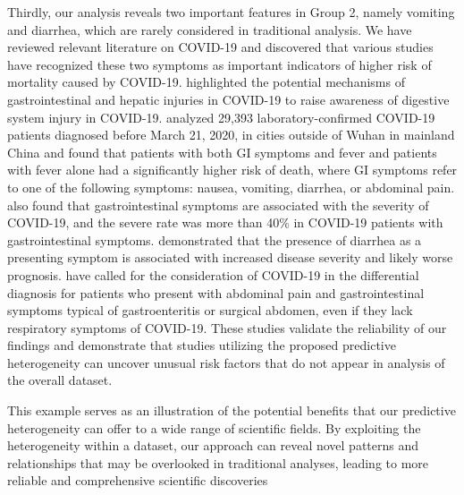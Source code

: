 Thirdly, our analysis reveals two important features in Group 2, namely vomiting and diarrhea, which are rarely considered in traditional analysis. 
We have reviewed relevant literature on COVID-19 and discovered that various studies have recognized these two symptoms as important indicators of higher risk of mortality caused by COVID-19. 
\citet{2020COVID} highlighted the potential mechanisms of gastrointestinal and hepatic injuries in COVID-19 to raise awareness of digestive system injury in COVID-19. 
\citet{Liu442} analyzed 29,393 laboratory-confirmed COVID-19 patients diagnosed before March 21, 2020, in cities outside of Wuhan in mainland China and found that patients with both GI symptoms and fever and patients with fever alone had a significantly higher risk of death, where GI symptoms refer to one of the following symptoms: nausea, vomiting, diarrhea, or abdominal pain. 
\citet{2021Gastrointestinal} also found that gastrointestinal symptoms are associated with the severity of COVID-19, and the severe rate was more than 40\% in COVID-19 patients with gastrointestinal symptoms. 
\citet{0Diarrhea} demonstrated that the presence of diarrhea as a presenting symptom is associated with increased disease severity and likely worse prognosis. 
\citet{2022COVID} have called for the consideration of COVID-19 in the differential diagnosis for patients who present with abdominal pain and gastrointestinal symptoms typical of gastroenteritis or surgical abdomen, even if they lack respiratory symptoms of COVID-19. 
These studies validate the reliability of our findings and demonstrate that studies utilizing the proposed predictive heterogeneity can uncover unusual risk factors that do not appear in analysis of the overall dataset.

This example serves as an illustration of the potential benefits that our predictive heterogeneity can offer to a wide range of scientific fields.
By exploiting the heterogeneity within a dataset, our approach can reveal novel patterns and relationships that may be overlooked in traditional analyses, leading to more reliable and comprehensive scientific discoveries



